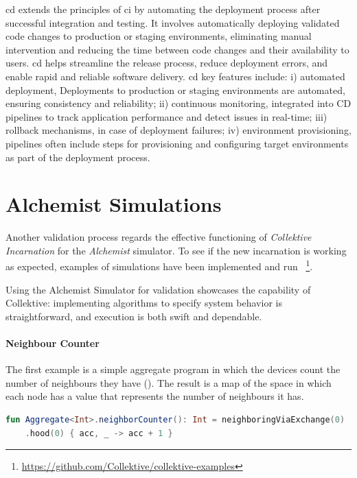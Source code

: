 \ac{cd} extends the principles of \ac{ci} by automating the deployment process after successful integration and testing.
It involves automatically deploying validated code changes to production or staging environments, eliminating manual
intervention and reducing the time between code changes and their availability to users.
\ac{cd} helps streamline the release process, reduce deployment errors, and enable rapid and reliable software delivery.
\ac{cd} key features include:
    i) automated deployment, Deployments to production or staging environments are automated, ensuring consistency and reliability;
    ii) continuous monitoring, integrated into CD pipelines to track application performance and detect issues in real-time;
    iii) rollback mechanisms, in case of deployment failures;
    iv) environment provisioning, pipelines often include steps for provisioning and configuring target environments as part of the deployment process.

\section{Alchemist Simulations}
\label{sec:alchemist-simulations}
Another validation process regards the effective functioning of \emph{Collektive Incarnation} for the \emph{Alchemist} simulator.
To see if the new incarnation is working as expected, examples of simulations have been implemented and run
~\footnote{\url{https://github.com/Collektive/collektive-examples}}.

Using the Alchemist Simulator for validation showcases the capability of Collektive: implementing algorithms to specify
system behavior is straightforward, and execution is both swift and dependable.

\paragraph{Neighbour Counter}
The first example is a simple aggregate program in which the devices count the number of neighbours they have ().
The result is a map of the space in which each node has a value that represents the number of neighbours it has.

\begin{lstlisting}[language=kt, caption={Neighbour counter code example}, label={lst:neighbour-counter-example}]
fun Aggregate<Int>.neighborCounter(): Int = neighboringViaExchange(0)
    .hood(0) { acc, _ -> acc + 1 }
\end{lstlisting}

